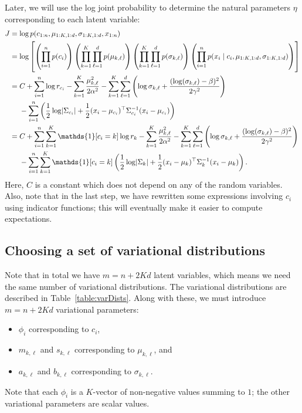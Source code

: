 \documentclass[11pt]{article}
\begin{document}
Later, we will use the log joint probability to determine the natural parameters $\eta$ corresponding to each latent variable:
\begin{align}
J
&= \log p(c_{1:n}, \mu_{1:K,1:d}, \sigma_{1:K,1:d}, x_{1:n}) \\
&= \log \left[
        \left( \prod_{i=1}^n p(c_i) \right)
        \left( \prod_{k=1}^K \prod_{\ell=1}^d p(\mu_{k, \ell}) \right)
        \left( \prod_{k=1}^K \prod_{\ell=1}^d p(\sigma_{k, \ell}) \right)
        \left( \prod_{i=1}^n p(x_i \mid c_i, \mu_{1:K,1:d}, \sigma_{1:K,1:d}) \right)
    \right] \\
&= \begin{aligned}[t]
    &C + \sum_{i=1}^n \log r_{c_i}
    - \sum_{k=1}^K \frac{\mu_{k, \ell}^2}{2\alpha^2}
    - \sum_{k=1}^K \sum_{\ell=1}^d \left( \log \sigma_{k,\ell} + \frac{ (\log(\sigma_{k,\ell}) - \beta)^2 }{2\gamma^2} \right) \\
    &- \sum_{i=1}^n \left( \frac{1}{2} \log \abs{ \Sigma_{c_i} } + \frac{1}{2} (x_i - \mu_{c_i})^\top \Sigma_{c_i}^{-1} (x_i - \mu_{c_i}) \right)
    \end{aligned} \\
\label{eq:logJointExample}
&= \begin{aligned}[t]
    &C + \sum_{i=1}^n \sum_{k=1}^K \mathds{1}[c_i = k] \log r_k
    - \sum_{k=1}^K \frac{\mu_{k, \ell}^2}{2\alpha^2}
    - \sum_{k=1}^K \sum_{\ell=1}^d \left( \log \sigma_{k,\ell} + \frac{ (\log(\sigma_{k,\ell}) - \beta)^2 }{2\gamma^2} \right) \\
    &- \sum_{i=1}^n \sum_{k=1}^K \mathds{1}[c_i = k] \left( \frac{1}{2} \log \abs{ \Sigma_k } + \frac{1}{2} (x_i - \mu_k)^\top \Sigma_k^{-1} (x_i - \mu_k) \right).
    \end{aligned}
\end{align}
Here, $C$ is a constant which does not depend on any of the random variables.
Also, note that in the last step, we have rewritten some expressions involving $c_i$ using indicator functions; this will eventually make it easier to compute expectations.

\subsection{Choosing a set of variational distributions}

Note that in total we have $m = n + 2Kd$ latent variables, which means we need the same number of variational distributions.
The variational distributions are described in Table~\ref{table:varDists}.
Along with these, we must introduce $m = n + 2Kd$ variational parameters:
\begin{itemize}
    \item $\phi_i$ corresponding to $c_i$,
    \item $m_{k,\ell}$ and $s_{k,\ell}$ corresponding to $\mu_{k,\ell}$, and
    \item $a_{k,\ell}$ and $b_{k,\ell}$ corresponding to $\sigma_{k,\ell}$.
\end{itemize}
Note that each $\phi_i$ is a $K$-vector of non-negative values summing to $1$; the other variational parameters are scalar values.
\end{document}
